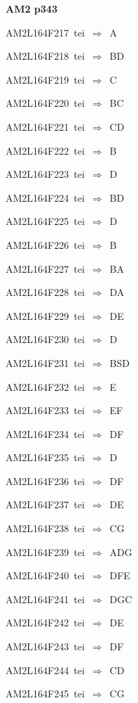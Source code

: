 \par\vfill\eject
{\bf\hfill AM2 p343\hfill\hbox{}}\par\bigskip
{\sixrm AM2L164F217\ {\sixit tei}\ }$\Rightarrow$\ A\par\smallskip
{\sixrm AM2L164F218\ {\sixit tei}\ }$\Rightarrow$\ BD\par\smallskip
{\sixrm AM2L164F219\ {\sixit tei}\ }$\Rightarrow$\ C\par\smallskip
{\sixrm AM2L164F220\ {\sixit tei}\ }$\Rightarrow$\ BC\par\smallskip
{\sixrm AM2L164F221\ {\sixit tei}\ }$\Rightarrow$\ CD\par\smallskip
{\sixrm AM2L164F222\ {\sixit tei}\ }$\Rightarrow$\ B\par\smallskip
{\sixrm AM2L164F223\ {\sixit tei}\ }$\Rightarrow$\ D\par\smallskip
{\sixrm AM2L164F224\ {\sixit tei}\ }$\Rightarrow$\ BD\par\smallskip
{\sixrm AM2L164F225\ {\sixit tei}\ }$\Rightarrow$\ D\par\smallskip
{\sixrm AM2L164F226\ {\sixit tei}\ }$\Rightarrow$\ B\par\smallskip
{\sixrm AM2L164F227\ {\sixit tei}\ }$\Rightarrow$\ BA\par\smallskip
{\sixrm AM2L164F228\ {\sixit tei}\ }$\Rightarrow$\ DA\par\smallskip
{\sixrm AM2L164F229\ {\sixit tei}\ }$\Rightarrow$\ DE\par\smallskip
{\sixrm AM2L164F230\ {\sixit tei}\ }$\Rightarrow$\ D\par\smallskip
{\sixrm AM2L164F231\ {\sixit tei}\ }$\Rightarrow$\ BSD\par\smallskip
{\sixrm AM2L164F232\ {\sixit tei}\ }$\Rightarrow$\ E\par\smallskip
{\sixrm AM2L164F233\ {\sixit tei}\ }$\Rightarrow$\ EF\par\smallskip
{\sixrm AM2L164F234\ {\sixit tei}\ }$\Rightarrow$\ DF\par\smallskip
{\sixrm AM2L164F235\ {\sixit tei}\ }$\Rightarrow$\ D\par\smallskip
{\sixrm AM2L164F236\ {\sixit tei}\ }$\Rightarrow$\ DF\par\smallskip
{\sixrm AM2L164F237\ {\sixit tei}\ }$\Rightarrow$\ DE\par\smallskip
{\sixrm AM2L164F238\ {\sixit tei}\ }$\Rightarrow$\ CG\par\smallskip
{\sixrm AM2L164F239\ {\sixit tei}\ }$\Rightarrow$\ ADG\par\smallskip
{\sixrm AM2L164F240\ {\sixit tei}\ }$\Rightarrow$\ DFE\par\smallskip
{\sixrm AM2L164F241\ {\sixit tei}\ }$\Rightarrow$\ DGC\par\smallskip
{\sixrm AM2L164F242\ {\sixit tei}\ }$\Rightarrow$\ DE\par\smallskip
{\sixrm AM2L164F243\ {\sixit tei}\ }$\Rightarrow$\ DF\par\smallskip
{\sixrm AM2L164F244\ {\sixit tei}\ }$\Rightarrow$\ CD\par\smallskip
{\sixrm AM2L164F245\ {\sixit tei}\ }$\Rightarrow$\ CG\par\smallskip

